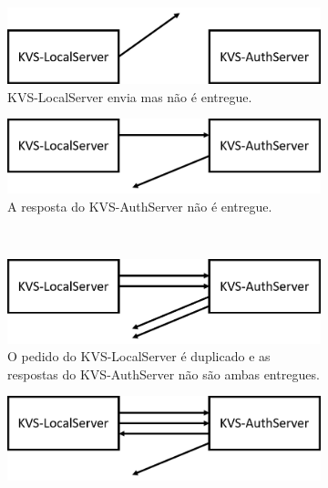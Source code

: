 \begin{figure}[ht]
    \centering
    \begin{subfigure}[b]{0.49\textwidth}
         \centering
         \includegraphics[width=\textwidth]{figures/udp_combo1.png}
         \caption{KVS-LocalServer envia mas não é entregue.}
         \label{fig:udp_combo1}
    \end{subfigure}
    \hfill
    \begin{subfigure}[b]{0.49\textwidth}
         \centering
         \includegraphics[width=\textwidth]{figures/udp_combo2.png}
         \caption{A resposta do KVS-AuthServer não é entregue.}
         \label{fig:udp_combo2}
    \end{subfigure}
    \\ \vspace{0.2cm}
    \begin{subfigure}[b]{0.49\textwidth}
         \centering
         \includegraphics[width=\textwidth]{figures/udp_combo3.png}
         \caption{O pedido do KVS-LocalServer é duplicado e as respostas do KVS-AuthServer não são ambas entregues.}
         \label{fig:udp_combo3}
    \end{subfigure}
    \hfill
    \begin{subfigure}[b]{0.49\textwidth}
         \centering
         \includegraphics[width=\textwidth]{figures/udp_combo4.png}

\end{subfigure}
\end{figure}
